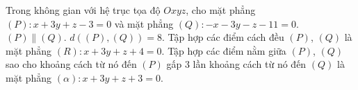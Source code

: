 \begin{ex}
Trong không gian với hệ trục tọa độ $Oxyz$, cho mặt phẳng $(P)\colon x+3y+z-3=0$ và mặt phẳng $(Q)\colon -x-3y-z-11=0$.
\choiceTF
{\True $(P)\parallel(Q)$.}
{$d\left((P),(Q)\right)=8$.}
{\True Tập hợp các điểm cách đều $(P)$, $(Q)$ là mặt phẳng $(R)\colon x+3y+z+4=0$.}
{Tập hợp các điểm nằm giữa $(P)$, $(Q)$ sao cho khoảng cách từ nó đến $(P)$ gấp $3$ lần khoảng cách từ nó đến $(Q)$ là mặt phẳng $(\alpha)\colon x+3y+z+3=0$.}
\end{ex}
